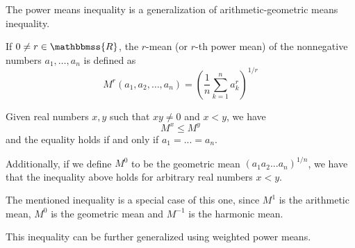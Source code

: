 \documentclass[12pt]{article}
\newcommand{\R}{\mathbbmss{R}}
\begin{document}
The power means inequality is a generalization of arithmetic-geometric means inequality.

If $0\neq r\in\R$, the $r$-mean (or $r$-th power mean) of the nonnegative
numbers $a_1,\ldots,a_n$ is defined as
$$M^r(a_1,a_2,\ldots,a_n)= \left(\frac{1}{n}\displaystyle{\sum_{k=1}^n a_k^r}\right)^{1/r}$$

Given real numbers $x,y$ such that $xy\neq 0$
and $x<y$, we have
$$M^x \leq M^y$$
and the equality holds if and only if $a_1 = ... = a_n$.

Additionally, if we define $M^0$ to be the
geometric mean $(a_1a_2...a_n)^{1/n}$, we have
that the inequality above holds for arbitrary real numbers $x<y$.

The mentioned inequality is a special case of this one, since $M^1$ is the arithmetic mean, $M^0$ is the geometric mean and $M^{-1}$ is the harmonic mean.

This inequality can be further generalized using weighted power means.
\end{document}
